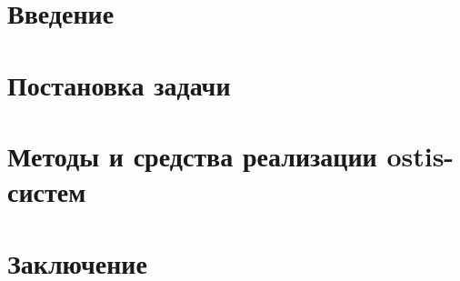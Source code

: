 \section*{Введение}


\newpage
\section{Постановка задачи}


\newpage
\section{Методы и средства реализации ostis-систем}


\newpage
\section*{Заключение}


\renewcommand\refname{} 

